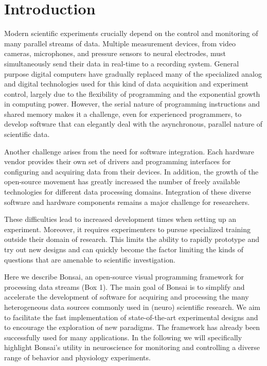 				
\section{Introduction}

Modern scientific experiments crucially depend on the control and monitoring of many parallel streams of data. Multiple measurement devices, from video cameras, microphones, and pressure sensors to neural electrodes, must simultaneously send their data in real-time to a recording system. General purpose digital computers have gradually replaced many of the specialized analog and digital technologies used for this kind of data acquisition and experiment control, largely due to the flexibility of programming and the exponential growth in computing power. However, the serial nature of programming instructions and shared memory makes it a challenge, even for experienced programmers, to develop software that can elegantly deal with the asynchronous, parallel nature of scientific data.

Another challenge arises from the need for software integration. Each hardware vendor provides their own set of drivers and programming interfaces for configuring and acquiring data from their devices. In addition, the growth of the open-source movement has greatly increased the number of freely available technologies for different data processing domains. Integration of these diverse software and hardware components remains a major challenge for researchers.

These difficulties lead to increased development times when setting up an experiment. Moreover, it requires experimenters to pursue specialized training outside their domain of research. This limits the ability to rapidly prototype and try out new designs and can quickly become the factor limiting the kinds of questions that are amenable to scientific investigation.

Here we describe Bonsai, an open-source visual programming framework for processing data streams (Box 1). The main goal of Bonsai is to simplify and accelerate the development of software for acquiring and processing the many heterogeneous data sources commonly used in (neuro) scientific research. We aim to facilitate the fast implementation of state-of-the-art experimental designs and to encourage the exploration of new paradigms. The framework has already been successfully used for many applications. In the following we will specifically highlight Bonsai's utility in neuroscience for monitoring and controlling a diverse range of behavior and physiology experiments.

